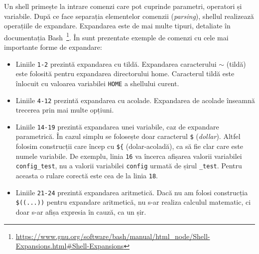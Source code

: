 Un shell primește la intrare comenzi care pot cuprinde parametri, operatori și variabile. După ce face separația elementelor comenzii (\textit{parsing}), shellul realizează operațiile de expandare. Expandarea este de mai
multe tipuri, detaliate în documentația Bash~\footnote{\url{https://www.gnu.org/software/bash/manual/html\_node/Shell-Expansions.html\#Shell-Expansions}}. În  sunt prezentate exemple de comenzi cu cele mai
importante forme de expandare:
\begin{itemize}
  \item Liniile \texttt{1-2} prezintă expandarea cu tildă. Expandarea caracterului \texttt{$\sim$} (tildă) este folosită pentru expandarea directorului home. Caracterul tildă este înlocuit cu valoarea variabilei \texttt{HOME} a shellului curent.
  \item Liniile \texttt{4-12} prezintă expandarea cu acolade.
Expandarea de acolade înseamnă trecerea prin mai multe opțiuni.
  \item Liniile \texttt{14-19} prezintă expandarea unei variabile, caz de expandare parametrică. În cazul simplu se folosește doar caracterul \texttt{\$} (\textit{dollar}). Altfel folosim construcții care încep cu \texttt{\$\{} (dolar-acoladă), ca să fie clar care este numele variabile.
    De exemplu, linia \texttt{16} va încerca afișarea valorii variabilei \texttt{config\_test}, nu a valorii variabilei \texttt{config} urmată de
    șirul \texttt{\_test}. Pentru aceasta o rulare corectă este cea de la linia \texttt{18}.
  \item Liniile \texttt{21-24} prezintă expandarea aritmetică. Dacă nu am folosi construcția \verb|$((...))| pentru expandare aritmetică, nu s-ar realiza calculul matematic, ci doar s-ar afișa expresia în cauză, ca un șir.
\end{itemize}



